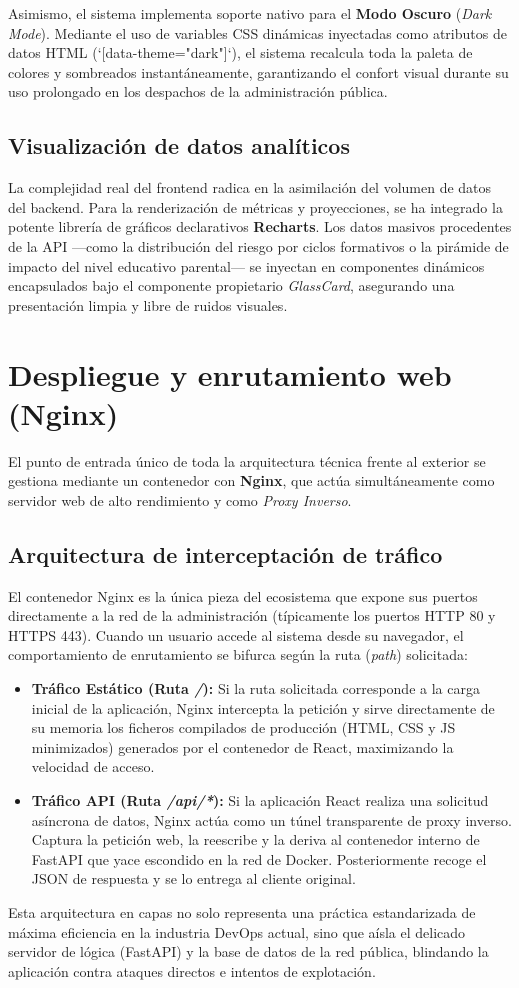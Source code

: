 Asimismo, el sistema implementa soporte nativo para el \textbf{Modo Oscuro} (\textit{Dark Mode}). Mediante el uso de variables CSS dinámicas inyectadas como atributos de datos HTML (`[data-theme="dark"]`), el sistema recalcula toda la paleta de colores y sombreados instantáneamente, garantizando el confort visual durante su uso prolongado en los despachos de la administración pública.

\subsection{Visualización de datos analíticos}

La complejidad real del frontend radica en la asimilación del volumen de datos del backend. Para la renderización de métricas y proyecciones, se ha integrado la potente librería de gráficos declarativos \textbf{Recharts}. Los datos masivos procedentes de la API —como la distribución del riesgo por ciclos formativos o la pirámide de impacto del nivel educativo parental— se inyectan en componentes dinámicos encapsulados bajo el componente propietario \textit{GlassCard}, asegurando una presentación limpia y libre de ruidos visuales.

\section{Despliegue y enrutamiento web (Nginx)}

El punto de entrada único de toda la arquitectura técnica frente al exterior se gestiona mediante un contenedor con \textbf{Nginx}, que actúa simultáneamente como servidor web de alto rendimiento y como \textit{Proxy Inverso}.

\subsection{Arquitectura de interceptación de tráfico}

El contenedor Nginx es la única pieza del ecosistema que expone sus puertos directamente a la red de la administración (típicamente los puertos HTTP 80 y HTTPS 443). Cuando un usuario accede al sistema desde su navegador, el comportamiento de enrutamiento se bifurca según la ruta (\textit{path}) solicitada:

\begin{itemize}
    \item \textbf{Tráfico Estático (Ruta \textit{/}):} Si la ruta solicitada corresponde a la carga inicial de la aplicación, Nginx intercepta la petición y sirve directamente de su memoria los ficheros compilados de producción (HTML, CSS y JS minimizados) generados por el contenedor de React, maximizando la velocidad de acceso.
    \item \textbf{Tráfico API (Ruta \textit{/api/*}):} Si la aplicación React realiza una solicitud asíncrona de datos, Nginx actúa como un túnel transparente de proxy inverso. Captura la petición web, la reescribe y la deriva al contenedor interno de FastAPI que yace escondido en la red de Docker. Posteriormente recoge el JSON de respuesta y se lo entrega al cliente original.
\end{itemize}

Esta arquitectura en capas no solo representa una práctica estandarizada de máxima eficiencia en la industria DevOps actual, sino que aísla el delicado servidor de lógica (FastAPI) y la base de datos de la red pública, blindando la aplicación contra ataques directos e intentos de explotación.
